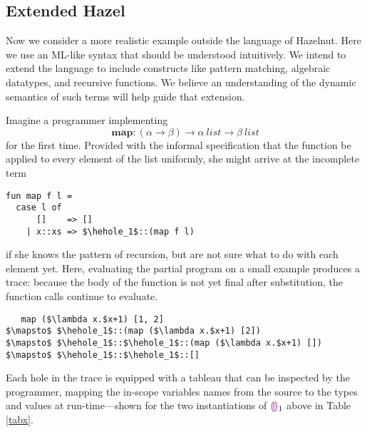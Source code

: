 \subsection{Extended Hazel}
Now we consider a more realistic example outside the language of
Hazelnut. Here we use an ML-like syntax that should be understood
intuitively. We intend to extend the language to include constructs like
pattern matching, algebraic datatypes, and recursive functions. We believe
an understanding of the dynamic semantics of such terms will help guide
that extension.

Imagine a programmer implementing $$\mathbf{map} : (\alpha \to \beta) \to
\alpha ~\mathit{list} \to \beta ~\mathit{list}$$ for the first time.
Provided with the informal specification that the function be applied to
every element of the list uniformly, she might arrive at the incomplete
term
\begin{lstlisting}
fun map f l =
  case l of
      []    => []
    | x::xs => $\hehole_1$::(map f l)
\end{lstlisting}
if she knows the pattern of recursion, but are not sure what to do with
each element yet. Here, evaluating the partial program on a small example
produces a trace: because the body of the function is not yet final after
substitution, the function calls continue to evaluate.
\begin{lstlisting}
   map ($\lambda x.$x+1) [1, 2]
$\mapsto$ $\hehole_1$::(map ($\lambda x.$x+1) [2])
$\mapsto$ $\hehole_1$::$\hehole_1$::(map ($\lambda x.$x+1) [])
$\mapsto$ $\hehole_1$::$\hehole_1$::[]
\end{lstlisting}
Each hole in the trace is equipped with a tableau that can be inspected by
the programmer, mapping the in-scope variables names from the source to the
types and values at run-time---shown for the two instantiations of
$\textcolor{violet}{\llparenthesis}\textcolor{violet}{\rrparenthesis}_1$ above in Table \ref{tabx}.

